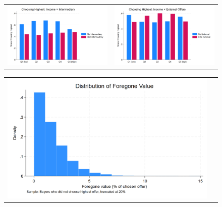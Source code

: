 \documentclass[12pt]{article}
\begin{document}
  \begin{figure}[H]
\caption{}
 \label{fig:ie4_11}
\centering{}%
\begin{tabular}{cc}
\includegraphics[scale=0.27]{figures/IE4/IE4_highest_income_intermediary.png} & \includegraphics[scale=0.27]{figures/IE4/IE4_highest_income_external.png} 
\end{tabular}
\end{figure} 


%




  \begin{figure}[H]
\caption{}
 \label{fig:ie4_11}
\centering{}%
\begin{tabular}{cc}
\includegraphics[scale=0.27]{figures/IE4/IE4_foregone_distribution.png} 
\end{tabular}
\end{figure} 
\end{document}
